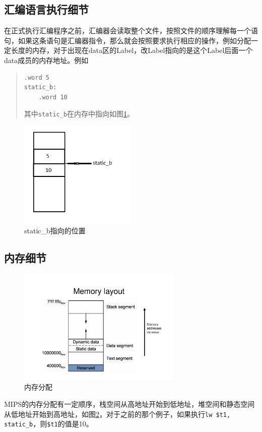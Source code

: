 \documentclass[a4paper, 11pt]{article}
\begin{document}
\subsection{汇编语言执行细节}
	在正式执行汇编程序之前，汇编器会读取整个文件，按照文件的顺序理解每一个语句，如果这条语句是汇编器指令，那么就会按照要求执行相应的操作，例如分配一定长度的内存，对于出现在data区的Label，改Label指向的是这个Label后面一个data成员的内存地址。例如
	
	\begin{quotation}
\begin{lstlisting}[frame=single]
	.word 5
static_b:
	.word 10
\end{lstlisting}
	其中\texttt{static\_b}在内存中指向如图\ref{fig:static-b}。
	\end{quotation}
	\begin{figure}[htbp]
		\centering
		\includegraphics[width=0.5\textwidth]{label-to-data}
		\caption{static\_b指向的位置}
		\label{fig:static-b}
	\end{figure}
\subsection{内存细节}
	\begin{figure}[htbp]
		\centering
		\includegraphics[angle=-90, width=0.7\textwidth]{SpimTutorial-page-7}
		\caption{内存分配}
		\label{fig:memory-alloc}
	\end{figure}
	MIPS的内存分配有一定顺序，栈空间从高地址开始到低地址，堆空间和静态空间从低地址开始到高地址，如图\ref{fig:memory-alloc}，对于之前的那个例子，如果执行\texttt{lw \$t1, static\_b}，则\texttt{\$t1}的值是10。
\end{document}
